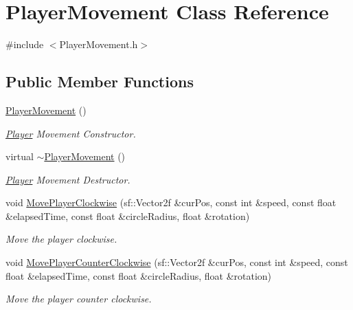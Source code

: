 \hypertarget{class_player_movement}{}\section{Player\+Movement Class Reference}
\label{class_player_movement}


{\ttfamily \#include $<$Player\+Movement.\+h$>$}

\subsection*{Public Member Functions}
\begin{DoxyCompactItemize}
\item 
\mbox{\label{class_player_movement_a7b8465579dfaddd25d12b628a747253f}} 
\hyperlink{class_player_movement_a7b8465579dfaddd25d12b628a747253f}{Player\+Movement} ()
\begin{DoxyCompactList}\small\item\em \hyperlink{class_player}{Player} Movement Constructor. \end{DoxyCompactList}\item 
\mbox{\label{class_player_movement_aa685d50858cd780ca628e89b346645f9}} 
virtual \hyperlink{class_player_movement_aa685d50858cd780ca628e89b346645f9}{$\sim$\+Player\+Movement} ()
\begin{DoxyCompactList}\small\item\em \hyperlink{class_player}{Player} Movement Destructor. \end{DoxyCompactList}\item 
void \hyperlink{class_player_movement_a9975a1cdcd2243f3b142cd94230118bc}{Move\+Player\+Clockwise} (sf\+::\+Vector2f \&cur\+Pos, const int \&speed, const float \&elapsed\+Time, const float \&circle\+Radius, float \&rotation)
\begin{DoxyCompactList}\small\item\em Move the player clockwise. \end{DoxyCompactList}\item 
void \hyperlink{class_player_movement_abc231fdfdbc0f2acb2bcb38b54b1320f}{Move\+Player\+Counter\+Clockwise} (sf\+::\+Vector2f \&cur\+Pos, const int \&speed, const float \&elapsed\+Time, const float \&circle\+Radius, float \&rotation)
\begin{DoxyCompactList}\small\item\em Move the player counter clockwise. \end{DoxyCompactList}\end{DoxyCompactItemize}



